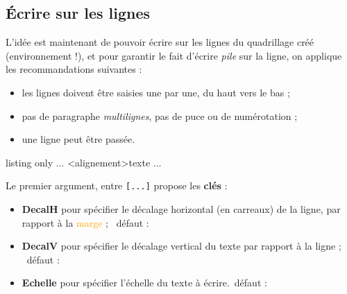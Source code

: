 \documentclass[a4paper]{article}
\newcommand\Cle[1]{{\bfseries\sffamily\textlangle #1\textrangle}}
\begin{document}
\medskip

\begin{PresentationCode}{}
\begin{EnvGurvan}
\end{EnvGurvan}
\end{PresentationCode}

\begin{PresentationCode}{}
\begin{EnvGurvan}[NbCarreaux=14x3,Interligne=2,Marge=2]
\end{EnvGurvan}
\end{PresentationCode}

\subsection{Écrire sur les lignes}

L'idée est maintenant de pouvoir écrire sur les lignes du quadrillage créé (environnement !), et pour garantir le fait d'écrire \textit{pile} sur la ligne, on applique les recommandations suivantes :

\begin{itemize}
	\item les lignes doivent être saisies une par une, du \og haut \fg{} vers le \og bas \fg{} ;
	\item pas de paragraphe \textit{multilignes}, pas de puce ou de numérotation ;
	\item une ligne peut être passée.
\end{itemize}

\begin{PresentationCode}{listing only}
...
	\EcrireLigneGurvan[clés]<alignement>{texte}
	\PasseLigneGurvan
...
\end{PresentationCode}

Le premier argument, entre \texttt{[...]} propose les \Cle{clés} :

\begin{itemize}
	\item \Cle{DecalH} pour spécifier le décalage horizontal (en carreaux) de la ligne, par rapport à la \textcolor{orange}{marge} ; \hfill~défaut : \Cle{0}
	\item \Cle{DecalV} pour spécifier le décalage vertical du texte par rapport à la ligne ; \hfill~défaut : \Cle{0pt}
	\item \Cle{Echelle} pour spécifier l'échelle du texte à écrire.\hfill~défaut : \Cle{1}
\end{itemize}
\end{document}
